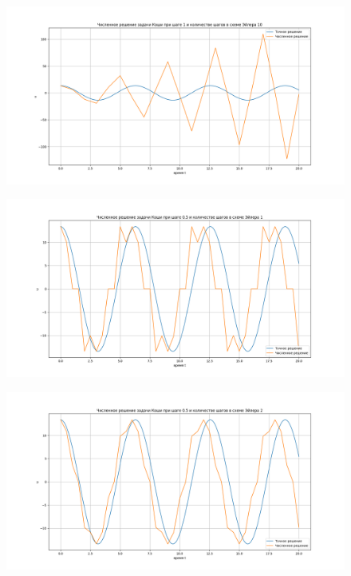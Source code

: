 \documentclass[diploma]{nanolab2015}
\begin{document}
\begin{figure}[h!]
\centering
\includegraphics[scale=0.5]{1 10.png}
\end{figure}

\begin{figure}[h!]
\centering
\includegraphics[scale=0.5]{05 1.png}
\end{figure}

\begin{figure}[h!]
\centering
\includegraphics[scale=0.5]{05 2.png}
\end{figure}
\end{document}
